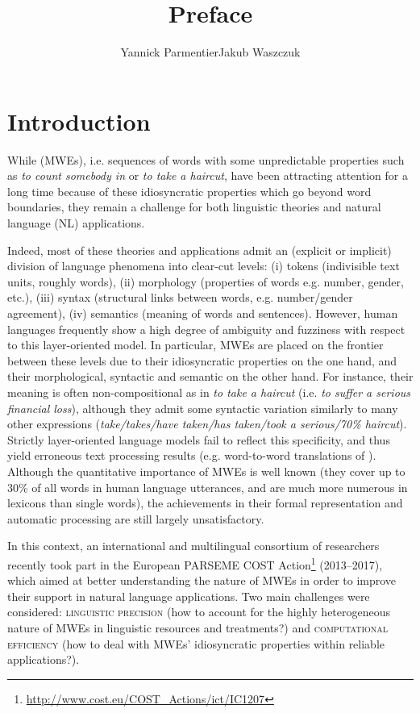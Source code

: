 \documentclass[output=paper]{langsci/langscibook}
\title{Preface}
\author{Yannick Parmentier\affiliation{University of Orléans\\University of Lorraine}\lastand Jakub Waszczuk\affiliation{University of Tours\\University of Düusseldorf}}
\begin{document}
\section{Introduction} 
While  (MWEs), i.e. sequences of words with some
unpredictable properties such as \textit{to count somebody in} or
\textit{to take a haircut}, have been attracting attention for a long
time because of these idiosyncratic properties which go beyond word
boundaries, they remain a challenge for both linguistic theories and
natural language (NL) applications.

Indeed, most of these theories and applications admit an (explicit or
implicit) division of language phenomena into clear-cut levels:
(i) tokens (indivisible text units, roughly words),
(ii) morphology (properties of words e.g. number, gender, etc.),
(iii) syntax (structural links between words, e.g. number/gender agreement),
(iv) semantics (meaning of words and sentences).
However, human languages frequently show a high degree of ambiguity
and fuzziness with respect to this layer-oriented model. In
particular, MWEs are placed on the frontier between these levels due
to their idiosyncratic properties on the one hand, and their
morphological, syntactic and semantic  on the other
hand. For instance, their meaning is often non-compositional as in \textit{to
take a haircut} (i.e. \textit{to suffer a serious financial loss}), although
they admit some syntactic variation similarly to many other
expressions (\textit{take/takes/have taken/has taken/took a serious/70\%
haircut}). Strictly layer-oriented language models fail to reflect
this specificity, and thus yield erroneous text processing results
(e.g. word-to-word translations of ). Although the quantitative
importance of MWEs is well known (they cover up to 30\% of all words
in human language utterances, and are much more numerous in lexicons
than single words), the achievements in their formal representation
and automatic processing are still largely unsatisfactory.

In this context, an international and multilingual consortium of
researchers recently took part in the European PARSEME COST
Action\footnote{\url{http://www.cost.eu/COST_Actions/ict/IC1207}}
(2013--2017), which aimed at better understanding the nature of MWEs in
order to improve their support in natural language applications. Two
main challenges were considered: \textsc{linguistic precision} (how to
account for the highly heterogeneous nature of MWEs in linguistic
resources and treatments?) and \textsc{computational efficiency} (how to
deal with MWEs' idiosyncratic properties within reliable applications?).
\end{document}
